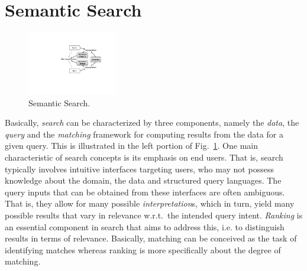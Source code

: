 \section{Semantic Search}\label{sec:ss}

\begin{figure}
	\centering
		\includegraphics[width=0.35\textwidth]{figs/semsearch.pdf}
	\caption{Semantic Search.}
	\label{fig:semsearch}
\end{figure}

Basically, \emph{search} can be characterized by three components, namely the \emph{data}, the \emph{query} and the \emph{matching} framework for computing results from the data for a given query. This is illustrated in the left portion of Fig.~\ref{fig:semsearch}. One main characteristic of search concepts is its emphasis on end users. That is, search typically involves intuitive interfaces targeting users, who may not possess knowledge about the domain, the data and structured query languages. The query inputs that can be obtained from these interfaces are often ambiguous. That is, they allow for many possible \emph{interpretation}s, which in turn, yield many possible results that vary in relevance w.r.t.~the intended query intent. 
\emph{Ranking} is an essential component in search that aims to address this, i.e. to distinguish results in terms of relevance. Basically, matching can be conceived as the task of identifying matches whereas ranking is more specifically about the degree of matching.   

